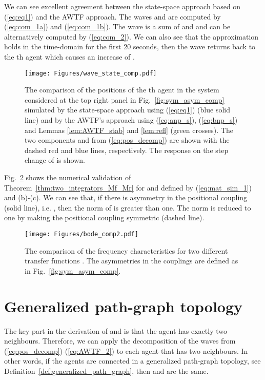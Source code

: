 \documentclass[10pt,twocolumn,twoside]{IEEEtran}
\theoremstyle{definition}
\newcommand{\revA}{Black}
\begin{document}
We can see excellent agreement between the state-space approach based on (\ref{eq:eq1}) and the AWTF approach. The waves  and  are computed by (\ref{eq:com_1a}) and (\ref{eq:com_1b}). The wave  is a sum of  and  and can be alternatively computed by (\ref{eq:com_2}). We can also see that the approximation  holds in the time-domain for the first 20 seconds, then the wave returns back to the th agent which causes an increase of .


\begin{figure}[ht]
 \centering
  \texttt{[image: Figures/wave\_state\_comp.pdf]}
  \caption{
The comparison of the positions of the th agent in the system considered at the top right panel in Fig.~\ref{fig:sym_asym_comp} simulated by the state-space approach using (\ref{eq:eq1}) (blue solid line) and by the AWTF's approach using (\ref{eq:anp_s}), (\ref{eq:bnp_s}) and Lemmas \ref{lem:AWTF_stab} and \ref{lem:refl} (green crosses). The two components  and  from (\ref{eq:pos_decomp}) are shown with the dashed red and blue lines, respectively. The response on the step change of  is shown.}
  \label{fig:wave_state_comp}
\end{figure}

Fig.~\ref{fig:bode_comp} shows the numerical validation of Theorem~\ref{thm:two_integrators_Mf_Mr} for  and  defined by (\ref{eq:mat_sim_1}) and (b)-(c). We can see that, if there is asymmetry in the positional coupling (solid line), i.e. , then the  norm of  is greater than one. The norm is reduced to one by making the positional coupling symmetric (dashed line).
\begin{figure}[ht]
 \centering
  \texttt{[image: Figures/bode\_comp2.pdf]}
  \caption{
The comparison of the frequency characteristics for two different transfer functions . The asymmetries in the couplings are defined as in Fig.~\ref{fig:sym_asym_comp}.}
  \label{fig:bode_comp}
\end{figure}






{\color{\revA}
\section{Generalized path-graph topology}
}
The key part in the derivation of  and  is that the agent has exactly two neighbours. Therefore, we can apply the decomposition of the waves from (\ref{eq:pos_decomp})-(\ref{eq:AWTF_2}) to each agent that has two neighbours. In other words, if the agents are connected in {\color{\revA}a generalized path-graph topology, see Definition~\ref{def:generalized_path_graph}}, then  and  are the same.
\end{document}
